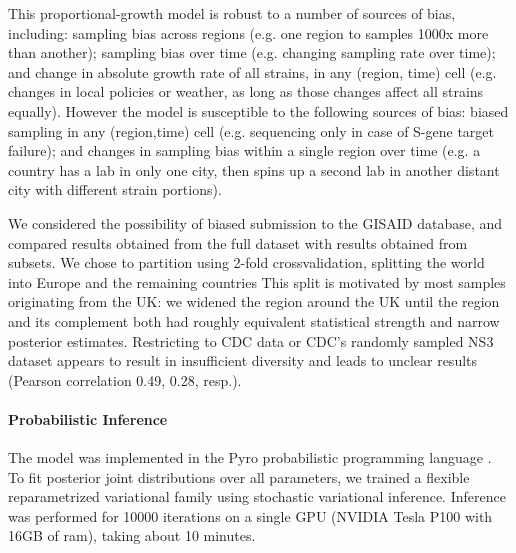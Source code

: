 \documentclass[12pt]{article}
\begin{document}
This proportional-growth model is robust to a number of sources of bias, including:
sampling bias across regions (e.g. one region to samples 1000x more than another);
sampling bias over time (e.g. changing sampling rate over time); and
change in absolute growth rate of all strains, in any (region, time) cell (e.g. changes in local policies or weather, as long as those changes affect all strains equally).
However the model is susceptible to the following sources of bias:
biased sampling in any (region,time) cell (e.g. sequencing only in case of S-gene target failure); and changes in sampling bias within a single region over time (e.g. a country has a lab in only one city, then spins up a second lab in another distant city with different strain portions).

We considered the possibility of biased submission to the GISAID database, and compared results obtained from the full dataset with results obtained from subsets.
We chose to partition using 2-fold crossvalidation, splitting the world into Europe and the remaining countries
This split is motivated by most samples originating from the UK: we widened the region around the UK until the region and its complement both had roughly equivalent statistical strength and narrow posterior estimates.
Restricting to CDC data or CDC's randomly sampled NS3 dataset appears to result in insufficient diversity and leads to unclear results (Pearson correlation 0.49, 0.28, resp.).

\paragraph*{Probabilistic Inference}

The model was implemented in the Pyro probabilistic programming language \cite{bingham2019pyro}.
To fit posterior joint distributions over all parameters, we trained a flexible reparametrized variational family using stochastic variational inference.
Inference was performed for 10000 iterations on a single GPU (NVIDIA Tesla P100 with 16GB of ram), taking about 10 minutes.




\end{document}

